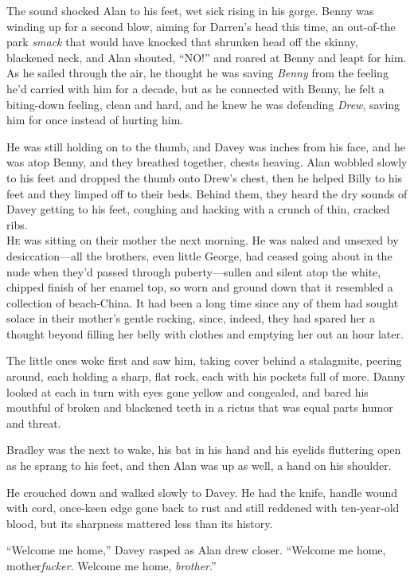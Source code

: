 The sound shocked Alan to his feet, wet sick rising in his gorge. 
Benny was winding up for a second blow, aiming for Darren's head this
time, an out-of-the park \textit{smack} that would have knocked that
shrunken head off the skinny, blackened neck, and Alan shouted,
``NO!'' and roared at Benny and leapt for him.  As he sailed through
the air, he thought he was saving \textit{Benny} from the feeling he'd
carried with him for a decade, but as he connected with Benny, he felt
a biting-down feeling, clean and hard, and he knew he was defending
\textit{Drew}, saving him for once instead of hurting him.

He was still holding on to the thumb, and Davey was inches from his
face, and he was atop Benny, and they breathed together, chests
heaving.  Alan wobbled slowly to his feet and dropped the thumb onto
Drew's chest, then he helped Billy to his feet and they limped off to
their beds.  Behind them, they heard the dry sounds of Davey getting
to his feet, coughing and hacking with a crunch of thin, cracked ribs.
\\
\lettrine[lines=3, lhang=.5, nindent=0pt, findent=2pt]{H}{e} was sitting on their mother the next morning.  He was naked and
unsexed by desiccation---all the brothers, even little George, had
ceased going about in the nude when they'd passed through
puberty---sullen and silent atop the white, chipped finish of her
enamel top, so worn and ground down that it resembled a collection of
beach-China.  It had been a long time since any of them had sought
solace in their mother's gentle rocking, since, indeed, they had
spared her a thought beyond filling her belly with clothes and
emptying her out an hour later.

The little ones woke first and saw him, taking cover behind a
stalagmite, peering around, each holding a sharp, flat rock, each with
his pockets full of more.  Danny looked at each in turn with eyes gone
yellow and congealed, and bared his mouthful of broken and blackened
teeth in a rictus that was equal parts humor and threat.

Bradley was the next to wake, his bat in his hand and his eyelids
fluttering open as he sprang to his feet, and then Alan was up as
well, a hand on his shoulder.

He crouched down and walked slowly to Davey.  He had the knife, handle
wound with cord, once-keen edge gone back to rust and still reddened
with ten-year-old blood, but its sharpness mattered less than its
history.

``Welcome me home,'' Davey rasped as Alan drew closer.  ``Welcome me
home, mother\textit{fucker}.  Welcome me home, \textit{brother}.''

